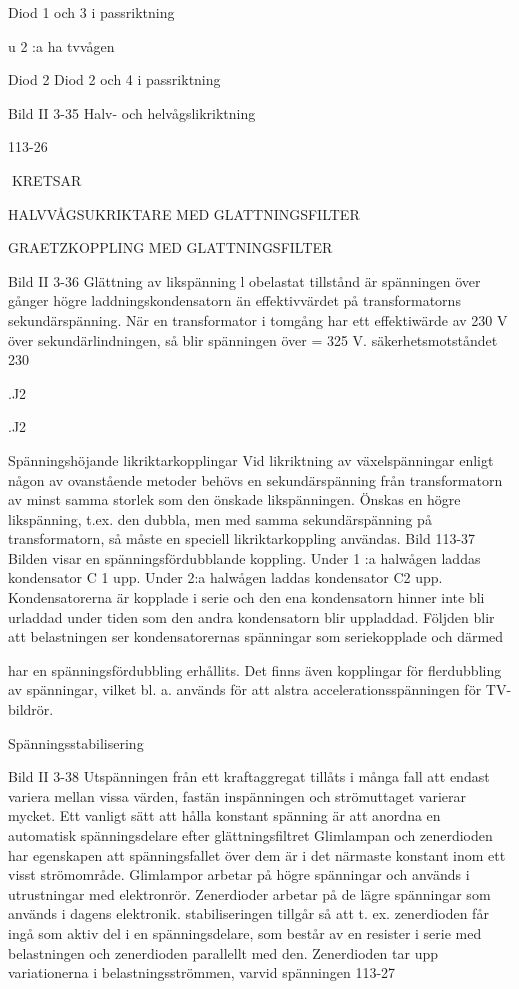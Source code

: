 {{{Diod 1 och 3 i passriktning

u
2 :a ha tvvågen

Diod 2 Diod 2 och 4 i passriktning

Bild II 3-35 Halv- och helvågslikriktning

113-26

KRETSAR

HALVVÅGSUKRIKTARE MED GLATTNINGSFILTER

GRAETZKOPPLING MED GLATTNINGSFILTER

Bild II 3-36 Glättning av likspänning
l obelastat tillstånd är spänningen över
gånger högre
laddningskondensatorn
än effektivvärdet på transformatorns sekundärspänning. När en transformator i tomgång har ett effektiwärde av 230 V över
sekundärlindningen, så blir spänningen över
= 325 V.
säkerhetsmotståndet 230

.J2

.J2

Spänningshöjande likriktarkopplingar
Vid likriktning av växelspänningar enligt någon av ovanstående metoder behövs en
sekundärspänning från transformatorn av
minst samma storlek som den önskade likspänningen. Önskas en högre likspänning,
t.ex. den dubbla, men med samma sekundärspänning på transformatorn, så måste en
speciell likriktarkoppling användas.
Bild 113-37
Bilden visar en spänningsfördubblande
koppling. Under 1 :a halwågen laddas kondensator C 1 upp. Under 2:a halwågen laddas kondensator C2 upp. Kondensatorerna
är kopplade i serie och den ena kondensatorn
hinner inte bli urladdad under tiden som den
andra kondensatorn blir uppladdad. Följden
blir att belastningen ser kondensatorernas
spänningar som seriekopplade och därmed

har en spänningsfördubbling erhållits. Det
finns även kopplingar för flerdubbling av
spänningar, vilket bl. a. används för att alstra
accelerationsspänningen för TV-bildrör.

Spänningsstabilisering

Bild II 3-38
Utspänningen från ett kraftaggregat tillåts i
många fall att endast variera mellan vissa
värden, fastän inspänningen och strömuttaget varierar mycket. Ett vanligt sätt att hålla
konstant spänning är att anordna en automatisk spänningsdelare efter glättningsfiltret
Glimlampan och zenerdioden har egenskapen att spänningsfallet över dem är i det
närmaste konstant inom ett visst strömområde. Glimlampor arbetar på högre spänningar och används i utrustningar med elektronrör. Zenerdioder arbetar på de lägre
spänningar som används i dagens elektronik.
stabiliseringen tillgår så att t. ex. zenerdioden får ingå som aktiv del i en spänningsdelare, som består av en resister i serie med
belastningen och zenerdioden parallellt med
den. Zenerdioden tar upp variationerna i
belastningsströmmen, varvid spänningen
113-27

}}}
